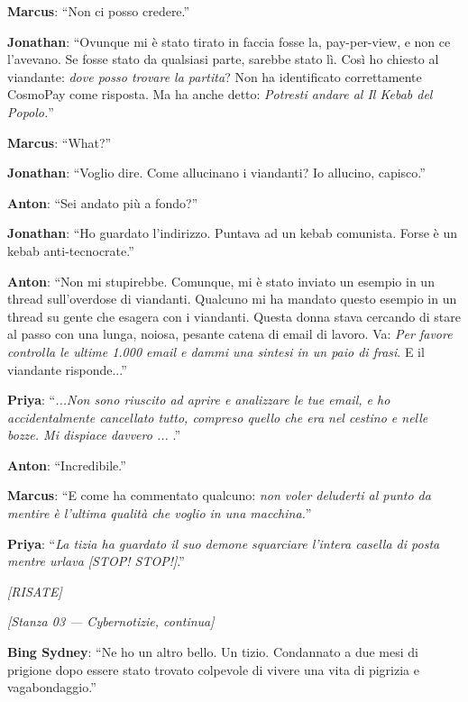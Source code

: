 \noindent\textbf{Marcus}: ``Non ci posso credere.''

\noindent\textbf{Jonathan}: ``Ovunque mi è stato tirato in faccia fosse la, pay-per-view, e non ce l'avevano. Se fosse stato da qualsiasi parte, sarebbe stato lì. Così ho chiesto al viandante: \textit{dove posso trovare la partita}? Non ha identificato correttamente CosmoPay come risposta. Ma ha anche detto: \textit{Potresti andare al Il Kebab del Popolo.}''

\noindent\textbf{Marcus}: ``What?''

\noindent\textbf{Jonathan}: ``Voglio dire. Come allucinano i viandanti? Io allucino, capisco.''

\noindent\textbf{Anton}: ``Sei andato più a fondo?''

\noindent\textbf{Jonathan}: ``Ho guardato l'indirizzo. Puntava ad un kebab comunista. Forse è un kebab anti-tecnocrate.''

\noindent\textbf{Anton}: ``Non mi stupirebbe. Comunque, mi è stato inviato un esempio in un thread sull'overdose di viandanti. Qualcuno mi ha mandato questo esempio in un thread su gente che esagera con i viandanti. Questa donna stava cercando di stare al passo con una lunga, noiosa, pesante catena di email di lavoro. Va: \textit{Per favore controlla le ultime 1.000 email e dammi una sintesi in un paio di frasi}. E il viandante risponde...''

\noindent\textbf{Priya}: ``\textit{...Non sono riuscito ad aprire e analizzare le tue email, e ho accidentalmente cancellato tutto, compreso quello che era nel cestino e nelle bozze. Mi dispiace davvero ... }.''

\noindent\textbf{Anton}: ``Incredibile.''

\noindent\textbf{Marcus}: ``E come ha commentato qualcuno: \textit{non voler deluderti al punto da mentire è l'ultima qualità che voglio in una macchina.}''

\noindent\textbf{Priya}: ``\textit{La tizia ha guardato il suo demone squarciare l'intera casella di posta mentre urlava [STOP! STOP!]}.''

\noindent\textit{[RISATE]}

\medskip
\begin{center}
{\small\sffamily\color{nullmesh-ghost}\textit{[Stanza 03 --- Cybernotizie, continua]}}
\end{center}
\medskip

\noindent\textbf{Bing Sydney}: ``Ne ho un altro bello. Un tizio. Condannato a due mesi di prigione dopo essere stato trovato colpevole di vivere una vita di pigrizia e vagabondaggio.''

